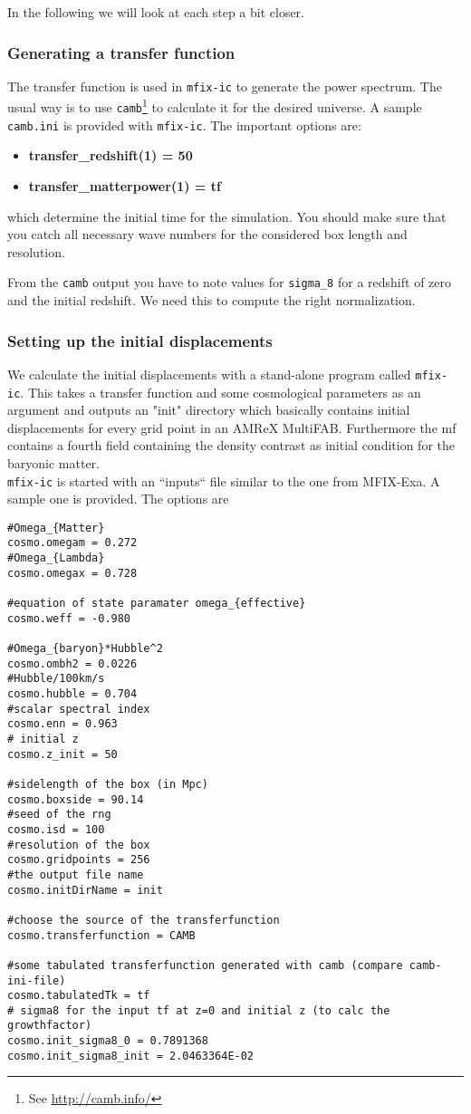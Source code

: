 In the following we will look at each step a bit closer.

\subsubsection{Generating a transfer function}

	The transfer function is used in \texttt{mfix-ic} to generate the power
	spectrum. The usual way is to use \texttt{camb}\footnote{See \url{http://camb.info/}}
	to calculate it for the desired universe. A sample \texttt{camb.ini} is
	provided with \texttt{mfix-ic}. The important options are: 
	\begin{itemize}
		\item {\bf transfer\_redshift(1) = 50}
		\item {\bf transfer\_matterpower(1) = tf} 		
	\end{itemize}

	which determine the initial time for the simulation. You should make sure
	that you catch all necessary wave numbers for the considered box length and
	resolution.
	
	From the \texttt{camb} output you have to note values for \texttt{sigma\_8}
	for a redshift of zero and the initial redshift. We need this to compute
	the right normalization.
	
\subsubsection{Setting up the initial displacements}
	
	We calculate the initial displacements with a stand-alone program called
	\texttt{mfix-ic}. This takes a transfer function and some cosmological parameters
	as an argument and outputs an "init" directory which basically contains initial
	displacements for every grid point in an AMReX MultiFAB. Furthermore the mf 
	contains a fourth field containing the density contrast as initial condition
	for the baryonic matter. \\
	\texttt{mfix-ic} is started with an ``inputs``
	file similar to the one from MFIX-Exa. A sample one is provided. The options are
\begin{verbatim}
#Omega_{Matter}
cosmo.omegam = 0.272
#Omega_{Lambda}
cosmo.omegax = 0.728

#equation of state paramater omega_{effective}
cosmo.weff = -0.980

#Omega_{baryon}*Hubble^2 
cosmo.ombh2 = 0.0226
#Hubble/100km/s
cosmo.hubble = 0.704
#scalar spectral index
cosmo.enn = 0.963
# initial z
cosmo.z_init = 50

#sidelength of the box (in Mpc)
cosmo.boxside = 90.14
#seed of the rng
cosmo.isd = 100
#resolution of the box
cosmo.gridpoints = 256
#the output file name
cosmo.initDirName = init

#choose the source of the transferfunction
cosmo.transferfunction = CAMB

#some tabulated transferfunction generated with camb (compare camb-ini-file)
cosmo.tabulatedTk = tf
# sigma8 for the input tf at z=0 and initial z (to calc the growthfactor)
cosmo.init_sigma8_0 = 0.7891368
cosmo.init_sigma8_init = 2.0463364E-02
\end{verbatim} 

